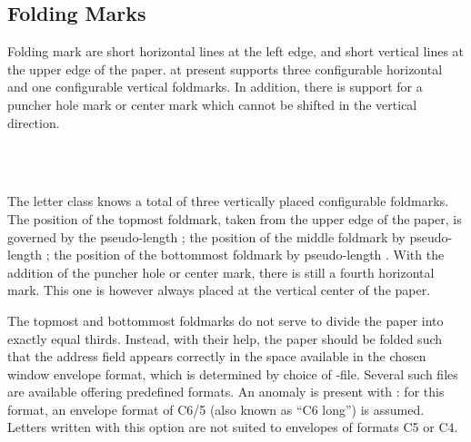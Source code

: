 \subsection{Folding Marks}
\label{sec:scrlttr2-experts.foldmarks}
%

Folding mark are short horizontal lines at the left edge, and short vertical
lines at the upper edge of the paper. \KOMAScript{} at present supports three
configurable horizontal and one configurable vertical foldmarks. In addition,
there is support for a puncher hole mark or center mark which cannot be
shifted in the vertical direction.

\begin{Declaration}
  \\
  \\
\end{Declaration}
%
%
%
The letter class  knows a total of three vertically placed
configurable foldmarks. The position of the topmost foldmark, taken from the
upper edge of the paper, is governed by the pseudo-length
; the position of the middle foldmark by pseudo-length
; the position of
the bottommost foldmark by pseudo-length . With the
addition of the puncher hole or center mark, there is still a fourth horizontal
mark. This one is however always placed at the vertical center of the paper.
\iffalse%
There's no pseudo-length for this last mark, because it vertical position is
not configurable.  \fi

The topmost and bottommost foldmarks do not serve to
divide the paper into exactly equal thirds. Instead, with their help, the
paper should be folded such that the address field appears correctly in the
space available in the chosen window envelope format, which is determined by
choice of -file. Several such files are available offering
predefined formats. An anomaly is present with : for this
format, an envelope format of C6/5 (also known as ``C6 long'') is
assumed. Letters written with this option are not suited to envelopes of
formats C5 or C4.

